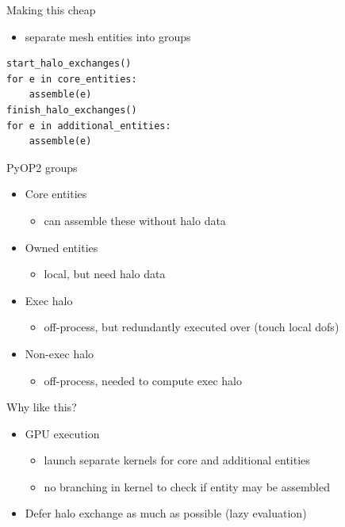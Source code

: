 \documentclass[presentation]{beamer}
\begin{document}
\begin{frame}[fragile,label={sec:orgheadline14}]{Making this cheap}
 \begin{itemize}
\item separate mesh entities into groups
\end{itemize}
\begin{verbatim}
start_halo_exchanges()
for e in core_entities:
    assemble(e)
finish_halo_exchanges()
for e in additional_entities:
    assemble(e)
\end{verbatim}
\end{frame}

\begin{frame}[label={sec:orgheadline15}]{PyOP2 groups}
\begin{itemize}
\item Core entities
\begin{itemize}
\item can assemble these without halo data
\end{itemize}
\item Owned entities
\begin{itemize}
\item local, but need halo data
\end{itemize}
\item Exec halo
\begin{itemize}
\item off-process, but redundantly executed over (touch local dofs)
\end{itemize}
\item Non-exec halo
\begin{itemize}
\item off-process, needed to compute exec halo
\end{itemize}
\end{itemize}
\end{frame}

\begin{frame}[label={sec:orgheadline16}]{Why like this?}
\begin{itemize}
\item GPU execution
\begin{itemize}
\item launch separate kernels for core and additional entities
\item no branching in kernel to check if entity may be assembled
\end{itemize}
\item Defer halo exchange as much as possible (lazy evaluation)
\end{itemize}
\end{frame}
\end{document}

